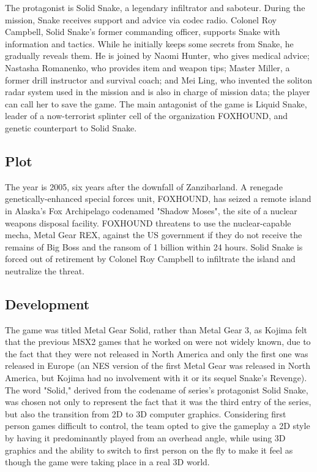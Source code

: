 \documentclass[a4paper,10pt]{book}
\begin{document}
          The protagonist is Solid Snake, a legendary infiltrator and saboteur. During the mission, Snake receives support and advice via codec radio. Colonel Roy Campbell, Solid Snake's former commanding officer, supports Snake with information and tactics. While he initially keeps some secrets from Snake, he gradually reveals them. 
           He is joined by Naomi Hunter, who gives medical advice; Nastasha Romanenko, who provides item and weapon tips; Master Miller, a former drill instructor and survival coach; and Mei Ling, who invented the soliton radar system used in the mission and is also in charge of mission data; the player can call her to save the game. 
           The main antagonist of the game is Liquid Snake, leader of a now-terrorist splinter cell of the organization FOXHOUND, and genetic counterpart to Solid Snake.
         
 \subsection{Plot }
 
          The year is 2005, six years after the downfall of Zanzibarland. A renegade genetically-enhanced special forces unit, FOXHOUND, has seized a remote island in Alaska's Fox Archipelago codenamed "Shadow Moses", the site of a nuclear weapons disposal facility. 
           FOXHOUND threatens to use the nuclear-capable mecha, Metal Gear REX, against the US government if they do not receive the remains of Big Boss and the ransom of 1 billion within 24 hours. Solid Snake is forced out of retirement by Colonel Roy Campbell to infiltrate the island and neutralize the threat.
         
 \subsection{Development }
 
          The game was titled Metal Gear Solid, rather than Metal Gear 3, as Kojima felt that the previous MSX2 games that he worked on were not widely known, due to the fact that they were not released in North America and only the first one was released in Europe (an NES version of the first Metal Gear was released in North America, but Kojima had no involvement with it or its sequel Snake's Revenge). The word "Solid," derived from the codename of series's protagonist Solid Snake, was chosen not only to represent the fact that it was the third entry of the series, but also the transition from 2D to 3D computer graphics. 
          Considering first person games difficult to control, the team opted to give the gameplay a 2D style by having it predominantly played from an overhead angle, while using 3D graphics and the ability to switch to first person on the fly to make it feel as though the game were taking place in a real 3D world.
         
\end{document}
